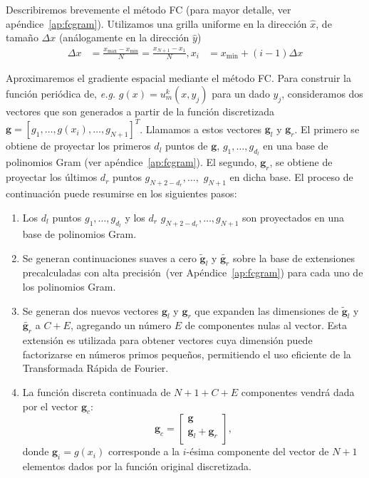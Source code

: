 Describiremos brevemente el método FC (para mayor detalle, ver apéndice~\ref{ap:fcgram}). 
Utilizamos una grilla uniforme en la dirección $\hat x$, 
de tamaño $\Delta x$ (análogamente en la dirección $\hat y$)
\begin{equation*}
\begin{aligned}
\Delta x &=\frac{x_{\text{max}}-x_{\text{min}}}{N} = \frac{x_{N+1} - x_1}{N} ,
x_i &=x_{\mathrm{min}}+(i-1)\Delta x
\end{aligned}
\end{equation*} 

Aproximaremos el gradiente espacial mediante el método FC.
Para construir la función periódica de, \textit{e.g.} $g(x)=u^k_m(x,y_j)$ para un dado $y_j$, 
consideramos dos vectores 
que son generados a partir de la función discretizada 
$\mathbf{g}=[g_1,\ldots,g(x_i),\ldots,g_{N+1}]^T$. Llamamos a estos vectores
$\mathbf{g}_l$ y $\mathbf{g}_r$. El primero 
se obtiene de proyectar los primeros $d_l$ puntos de $\mathbf{g}$, $g_1,\ldots,g_{d_l}$ 
en una base de polinomios Gram (ver apéndice~\ref{ap:fcgram}). El segundo, $\mathbf{g}_r$, se 
obtiene de proyectar los últimos $d_r$ puntos $g_{N+2-d_r},\ldots,$ $g_{N+1}$ en dicha base. 
El proceso de continuación puede resumirse en los siguientes pasos:
\begin{enumerate}
\item Los $d_l$ puntos $g_1,\ldots,g_{d_l}$
y los $d_r$ $g_{N+2-d_r},\ldots,g_{N+1}$ 
son proyectados en una base de polinomios Gram.

\item Se generan continuaciones suaves a cero
$\widetilde{\mathbf{g}}_l$ y 
$\widetilde{\mathbf{g}_r}$ sobre la base de extensiones 
precalculadas con alta precisión~(ver Apéndice~\ref{ap:fcgram})  
para cada uno de los polinomios Gram.

\item Se generan dos nuevos vectores $\mathbf{g}_l$ y $\mathbf{g}_r$ 
que expanden las dimensiones de $\widetilde{\mathbf{g}}_l$ y $\widetilde{\mathbf{g}_r}$
 a $C+E$, agregando un número $E$ de componentes nulas al vector. 
Esta extensión es utilizada para obtener vectores cuya 
dimensión puede factorizarse en números primos pequeños, 
permitiendo el uso eficiente de la Transformada Rápida de Fourier.

\item La función discreta continuada de $N+1+C+E$ componentes 
vendrá dada por el vector $\mathbf{g}_c$:  
\begin{equation*}
\mathbf{g}_c=
\begin{bmatrix}
    \mathbf{g} \\
    \mathbf{g}_l+\mathbf{g}_r  \\
\end{bmatrix}
,
\label{eq:FCStepsCondensed}
\end{equation*}
donde $\mathbf{g}_i=g(x_i)$ corresponde a la $i$-ésima componente del vector 
de $N+1$ elementos dados por la función original discretizada.
\end{enumerate}

